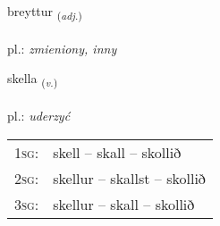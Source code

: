 \documentclass[frontgrid, backgrid]{flacards}\usepackage[]{graphicx}\usepackage[]{xcolor}
\begin{document}
\renewcommand{\flhead}{\vskip5pt \fboxsep=0pt {\small\bfseries\footnotesize Lýsingarorð | Adjective}}
\renewcommand{\fcfoot}{\vskip5pt \fboxsep=0pt \hspace{2pt}{\small\bfseries\footnotesize 2K}}

\renewcommand{\blhead}{\vskip5pt {\small\bfseries\footnotesize Lýsingarorð | Adjective }}
\renewcommand{\bcfoot}{\vskip5pt \hspace{2pt}{\small\bfseries\footnotesize 2K}}


{breyttur \small{\textsubscript{(\textit{adj.})}} \\[1ex] %
\textphonetic{[preihtʏr]} \\
pl.: \emph{zmieniony, inny} \\  [2ex]
\renewcommand*{\arraystretch}{0.8}
}

\renewcommand{\flhead}{\vskip5pt \fboxsep=0pt {\small\bfseries\footnotesize Sagnorð | Verb}}
\renewcommand{\fcfoot}{\vskip5pt \fboxsep=0pt \hspace{2pt}{\small\bfseries\footnotesize 2K}}

\renewcommand{\blhead}{\vskip5pt {\small\bfseries\footnotesize Sagnorð | Verb }}
\renewcommand{\bcfoot}{\vskip5pt \hspace{2pt}{\small\bfseries\footnotesize 2K}}


{skella \small{\textsubscript{(\textit{v.})}} \\[1ex] %
\textphonetic{[scɛtla]} \\
pl.: \emph{uderzyć} \\  [2ex]
\renewcommand*{\arraystretch}{0.8}
\begin{tabular}{p{1cm}l}
\textsc{1sg}: & skell -- skall -- skollið \\ 
\textsc{2sg}: & skellur -- skallst -- skollið \\ 
\textsc{3sg}: & skellur -- skall -- skollið \\ 
\end{tabular}
}
\end{document}
